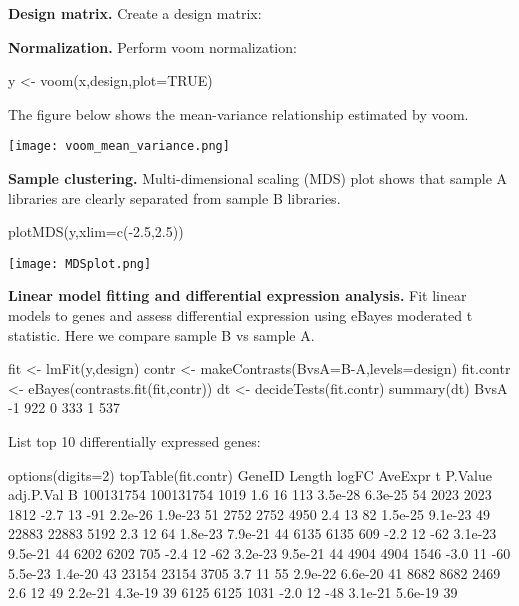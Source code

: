 \documentclass[12pt]{report}
\newcommand{\voom}{\textsf{voom}}
\begin{document}
{\noindent\bf Design matrix.} Create a design matrix: 


{\noindent\bf Normalization.} Perform {\voom} normalization: 

\begin{Rcode}
y <- voom(x,design,plot=TRUE)
\end{Rcode}

The figure below shows the mean-variance relationship estimated by voom.
\begin{center}
\texttt{[image: voom\_mean\_variance.png]}
\end{center}

{\noindent\bf Sample clustering.} Multi-dimensional scaling (MDS) plot shows that sample A libraries are clearly separated from sample B libraries.

\begin{Rcode}
plotMDS(y,xlim=c(-2.5,2.5))
\end{Rcode}

\begin{center}
\texttt{[image: MDSplot.png]}
\end{center}

{\noindent\bf Linear model fitting and differential expression analysis.} Fit linear models to genes and assess differential expression using eBayes moderated t statistic.
Here we compare sample B vs sample A.

\begin{Rcode}
fit <- lmFit(y,design)
contr <- makeContrasts(BvsA=B-A,levels=design)
fit.contr <- eBayes(contrasts.fit(fit,contr))
dt <- decideTests(fit.contr)
summary(dt)
   BvsA
-1  922
0   333
1   537
\end{Rcode}

List top 10 differentially expressed genes: 

\begin{Rcode}
options(digits=2)
topTable(fit.contr)
             GeneID Length logFC AveExpr   t P.Value adj.P.Val  B
100131754 100131754   1019   1.6      16 113 3.5e-28   6.3e-25 54
2023           2023   1812  -2.7      13 -91 2.2e-26   1.9e-23 51
2752           2752   4950   2.4      13  82 1.5e-25   9.1e-23 49
22883         22883   5192   2.3      12  64 1.8e-23   7.9e-21 44
6135           6135    609  -2.2      12 -62 3.1e-23   9.5e-21 44
6202           6202    705  -2.4      12 -62 3.2e-23   9.5e-21 44
4904           4904   1546  -3.0      11 -60 5.5e-23   1.4e-20 43
23154         23154   3705   3.7      11  55 2.9e-22   6.6e-20 41
8682           8682   2469   2.6      12  49 2.2e-21   4.3e-19 39
6125           6125   1031  -2.0      12 -48 3.1e-21   5.6e-19 39
\end{Rcode}




\end{document}
